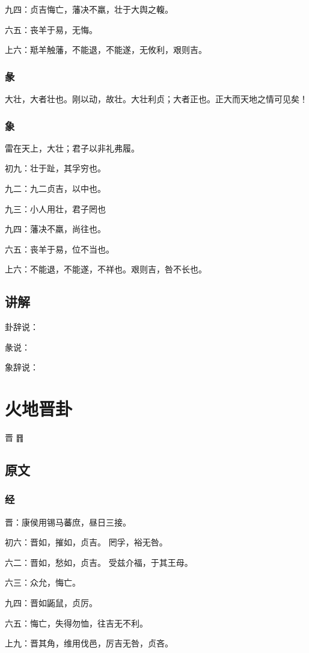 \documentclass[12pt,oneside]{book}
\begin{document}
九四：贞吉悔亡，藩决不羸，壮于大舆之輹。

六五：丧羊于易，无悔。

上六：羝羊触藩，不能退，不能遂，无攸利，艰则吉。

\subsection{彖}
大壮，大者壮也。刚以动，故壮。大壮利贞；大者正也。正大而天地之情可见矣！

\subsection{象}
雷在天上，大壮；君子以非礼弗履。

初九：壮于趾，其孚穷也。

九二：九二贞吉，以中也。

九三：小人用壮，君子罔也

九四：藩决不羸，尚往也。

六五：丧羊于易，位不当也。

上六：不能退，不能遂，不祥也。艰则吉，咎不长也。

\section{讲解}
卦辞说：

彖说：

象辞说：

\chapter{火地晋卦}
晋 {\Large ䷢}

\section{原文}

\subsection{经}
晋：康侯用锡马蕃庶，昼日三接。

初六：晋如，摧如，贞吉。 罔孚，裕无咎。

六二：晋如，愁如，贞吉。 受兹介福，于其王母。

六三：众允，悔亡。

九四：晋如鼫鼠，贞厉。

六五：悔亡，失得勿恤，往吉无不利。

上九：晋其角，维用伐邑，厉吉无咎，贞吝。
\end{document}
